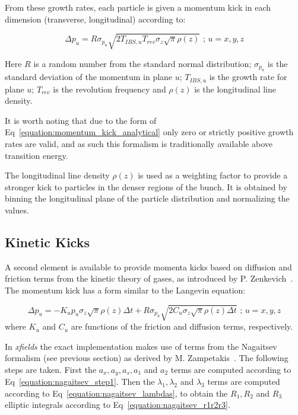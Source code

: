 From these growth rates, each particle is given a momentum kick in each dimension (transverse, longitudinal) according to:

\begin{equation}
    \boxed{\Delta p_u = R \sigma_{p_u} \sqrt{ 2 T_{IBS,u} T_{rev} \sigma_z \sqrt{\pi} \rho(z)} \text{ ;   } u=x,y,z}
    \label{equation:momentum_kick_analytical}
\end{equation}

Here \(R\) is a random number from the standard normal distribution; \(\sigma_{p_u}\) is the standard deviation of the momentum in plane \(u\); \(T_{IBS,u}\) is the growth rate for plane \(u\); \(T_{rev}\) is the revolution frequency and \(\rho(z)\) is the longitudinal line density.

It is worth noting that due to the form of Eq~\eqref{equation:momentum_kick_analytical} only zero or strictly positive growth rates are valid, and as such this formalism is traditionally available above transition energy.

The longitudinal line density \(\rho(z)\) is used as a weighting factor to provide a stronger kick to particles in the denser regions of the bunch.
It is obtained by binning the longitudinal plane of the particle distribution and normalizing the values.

\subsection{Kinetic Kicks}

A second element is available to provide momenta kicks based on diffusion and friction terms from the kinetic theory of gases, as introduced by P. Zenkevich~\cite{NuclInstr:Zenkevich:IBSKineticKick}.
The momentum kick has a form similar to the Langevin equation:

\begin{equation}
    \Delta p_u = - K_u p_u \sigma_z \sqrt{\pi} \rho(z) \Delta t + R \sigma_{p_u} \sqrt{2 C_u \sigma_z \sqrt{\pi} \rho(z) \Delta t} \text{ ;   } u=x,y,z
    \label{equation:original_kinetic_kick}
\end{equation}
where \(K_u\) and \(C_u\) are functions of the friction and diffusion terms, respectively.
\newline

In \textit{xfields} the exact implementation makes use of terms from the Nagaitsev formalism (see previous section) as derived by M. Zampetakis~\cite{arXiv:Zampetakis:Interplay_SC_IBS_LHC_Chain}.
The following steps are taken.
First the \(a_x, a_y, a_s, a_1\) and \(a_2\) terms are computed according to Eq~\eqref{equation:nagaitsev_step1}.
Then the \(\lambda_1, \lambda_2\) and \(\lambda_3\) terms are computed according to Eq~\eqref{equation:nagaitsev_lambdas}, to obtain the \(R_1, R_2\) and \(R_3\) elliptic integrals according to Eq~\eqref{equation:nagaitsev_r1r2r3}.

